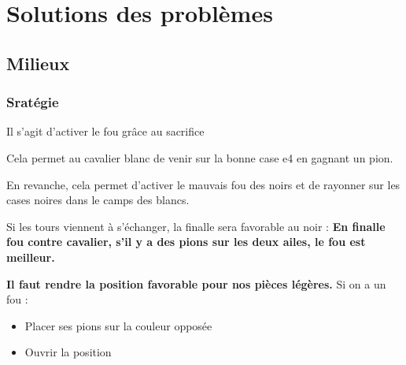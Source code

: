 
\chapter{Solutions des problèmes}



\section{Milieux}

\subsection{Sratégie}

\newgame
{}
\begin{minipage}{0.45\textwidth}
\hspace{0.7cm}
\vspace{0.25cm}

\hspace{0.7cm} Il s'agit d'activer le fou grâce au sacrifice 
\vspace{0.25cm}

\hspace{0.7cm} Cela permet au cavalier blanc de venir sur la bonne case e4 en gagnant un pion.
\vspace{0.25cm}

\hspace{0.7cm} En revanche, cela permet d'activer le mauvais fou des noirs et de rayonner sur les cases noires dans le camps des blancs. 
\vspace{0.25cm}

\end{minipage}
\hfill
\begin{minipage}{0.45\textwidth}
\chessboard[
inverse,markstyle=leftborder,
]%
\end{minipage}

Si les tours viennent à s'échanger, la finalle sera favorable au noir : 
{\bf En finalle fou contre cavalier, s'il y a des pions sur les deux ailes, le fou est meilleur.}

{\bf Il faut rendre la position favorable pour nos pièces légères.} Si on a un fou : 

\begin{itemize}[leftmargin=1cm, label=, itemsep=1pt]
\item  Placer ses pions sur la couleur opposée
\item  Ouvrir la position
\end{itemize}

